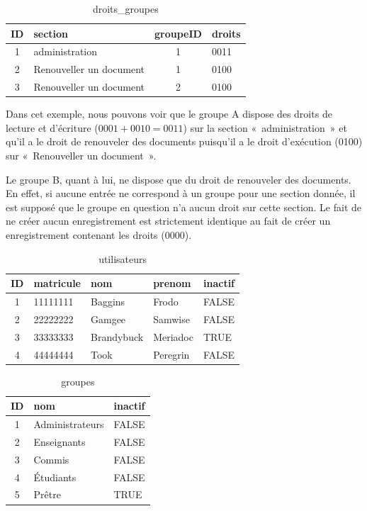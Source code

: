 \documentclass[letter, 11pt]{report}
\begin{document}
\begin{table}[h!]
	\caption{droits\_groupes}
	\begin{center}
		\begin{tabular}{|c|l|c|l|}
			\hline
			ID & section                 & groupeID & droits \\
			\hline
			1  & administration          & 1        & 0011 \\
			2  & Renouveller un document & 1        & 0100 \\
			3  & Renouveller un document & 2        & 0100 \\
			\hline
		\end{tabular}
	\end{center}
\end{table}

Dans cet exemple, nous pouvons voir que le groupe A dispose des droits de lecture et d'écriture ($ 0001 + 0010 = 0011 $) sur la section «~administration~» et qu'il a le droit de renouveler des documents puisqu'il a le droit d'exécution (0100) sur «~Renouveller un document~».

Le groupe B, quant à lui, ne dispose que du droit de renouveler des documents. En effet, si aucune entrée ne correspond à un groupe pour une section donnée, il est supposé que le groupe en question n'a aucun droit sur cette section. Le fait de ne créer aucun enregistrement est strictement identique au fait de créer un enregistrement contenant les droits (0000).

\begin{table}[h!]
	\caption{utilisateurs}
	\begin{center}
		\begin{tabular}{|c|l|l|l|l|}
			\hline
			ID & matricule & nom         & prenom   & inactif \\
			\hline
			1  & 11111111  & Baggins     & Frodo    & FALSE \\
			2  & 22222222  & Gamgee      & Samwise  & FALSE \\
			3  & 33333333  & Brandybuck  & Meriadoc & TRUE \\
			4  & 44444444  & Took        & Peregrin & FALSE \\
			\hline
		\end{tabular}
	\end{center}
\end{table}

\begin{table}[h!]
	\caption{groupes}
	\begin{center}
		\begin{tabular}{|c|l|l|}
			\hline
			ID & nom               & inactif \\
			\hline
			1  & Administrateurs   & FALSE \\
			2  & Enseignants       & FALSE \\
			3  & Commis            & FALSE \\
			4  & Étudiants         & FALSE \\
			5  & Prêtre            & TRUE \\
			\hline
		\end{tabular}
	\end{center}
\end{table}
\end{document}
